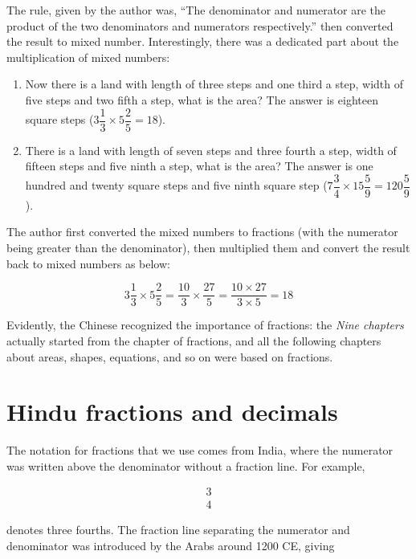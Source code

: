\documentclass[b5paper]{article}
\begin{document}
The rule, given by the author was, \enquote{The denominator and numerator are the product of the two denominators and numerators respectively.} then converted the result to mixed number. Interestingly, there was a dedicated part about the multiplication of mixed numbers:

\begin{enumerate}[1)]
\item Now there is a land with length of three steps and one third a step, width of five steps and two fifth a step, what is the area? The answer is eighteen square steps ($3\dfrac{1}{3} \times 5\dfrac{2}{5} = 18$).
\item There is a land with length of seven steps and three fourth a step, width of fifteen steps and five ninth a step, what is the area? The answer is one hundred and twenty square steps and five ninth square step ($7\dfrac{3}{4} \times 15\dfrac{5}{9} = 120\dfrac{5}{9}$).
\end{enumerate}

The author first converted the mixed numbers to fractions (with the numerator being greater than the denominator), then multiplied them and convert the result back to mixed numbers as below:

\[
3\frac{1}{3} \times 5\frac{2}{5} = \frac{10}{3} \times \frac{27}{5} = \frac{10 \times 27}{3 \times 5} = 18
\]

Evidently, the Chinese recognized the importance of fractions: the \emph{Nine chapters} actually started from the chapter of fractions, and all the following chapters about areas, shapes, equations, and so on were based on fractions.

\section{Hindu fractions and decimals}

The notation for fractions that we use comes from India, where the numerator was written above the denominator without a fraction line. For example,

\begin{align*}
  3 \\
  4
\end{align*}

denotes three fourths. The fraction line separating the numerator and denominator was introduced by the Arabs around 1200 CE\cite{Pumfrey-2011}, giving
\end{document}
